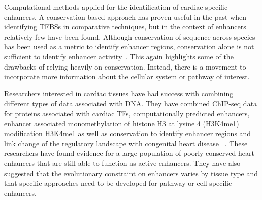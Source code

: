 Computational methods applied for the identification of cardiac specific enhancers. A conservation based approach has proven useful in the past when identifying TFBSs in comparative techniques, but in the context of enhancers relatively few have been found. Although conservation of sequence across species has been used as a metric to identify enhancer regions, conservation alone is not sufficient to identify enhancer activity~\cite{blow2010chip}. This again highlights some of the drawbacks of relying heavily on conservation. Instead, there is a movement to incorporate more information about the cellular system or pathway of interest. 
 
Researchers interested in cardiac tissues have had success with combining different types of data associated with DNA. They have combined ChIP-seq data for proteins associated with cardiac TFs, computationally predicted enhancers, enhancer associated monomethylation of histone H3 at lysine 4 (H3K4me1) modification H3K4me1 as well as conservation to identify enhancer regions and link change of the regulatory landscape with congenital heart disease ~\cite{smemo2012regulatory}. These researchers have found evidence for a large population of poorly conserved heart enhancers that are still able to function as active enhancers. They have also suggested that the evolutionary constraint on enhancers varies by tissue type and that specific approaches need to be developed for pathway or cell specific enhancers. 


       


   
